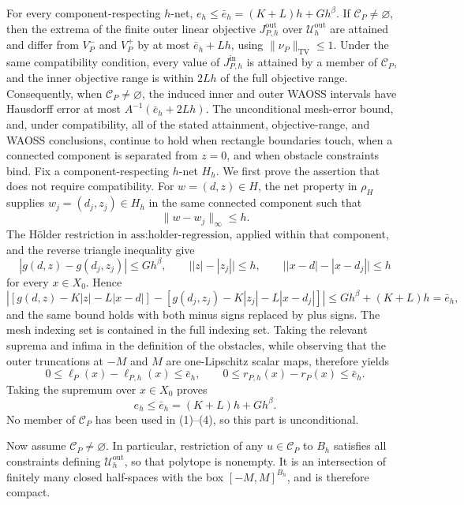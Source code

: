 For every component-respecting \(h\)-net, \(e_h\leq\bar e_h=(K+L)h+Gh^\beta\). If \(\mathcal C_P\neq\varnothing\), then the extrema of the finite outer linear objective \(J_{P,h}^{\mathrm{out}}\) over \(\mathcal U_h^{\mathrm{out}}\) are attained and differ from \(V_P^-\) and \(V_P^+\) by at most \(\bar e_h+Lh\), using \(\|\nu_P\|_{\mathrm{TV}}\leq1\). Under the same compatibility condition, every value of \(J_{P,h}^{\mathrm{in}}\) is attained by a member of \(\mathcal C_P\), and the inner objective range is within \(2Lh\) of the full objective range. Consequently, when \(\mathcal C_P\neq\varnothing\), the induced inner and outer WAOSS intervals have Hausdorff error at most \(A^{-1}(\bar e_h+2Lh)\). The unconditional mesh-error bound, and, under compatibility, all of the stated attainment, objective-range, and WAOSS conclusions, continue to hold when rectangle boundaries touch, when a connected component is separated from \(z=0\), and when obstacle constraints bind.
Fix a component-respecting \(h\)-net \(H_h\). We first prove the assertion that does not require compatibility. For \(w=(d,z)\in H\), the net property in \(\rho_H\) supplies \(w_j=(d_j,z_j)\in H_h\) in the same connected component such that
\[
 \|w-w_j\|_\infty\leq h.
\]
The H\"older restriction in \(\text{ass:holder-regression}\), applied within that component, and the reverse triangle inequality give
\[
 |g(d,z)-g(d_j,z_j)|\leq Gh^\beta,
 \qquad \bigl||z|-|z_j|\bigr|\leq h,
 \qquad \bigl||x-d|-|x-d_j|\bigr|\leq h                         \tag{1}
\]
for every \(x\in X_0\). Hence
\[
 \left|[g(d,z)-K|z|-L|x-d|]-[g(d_j,z_j)-K|z_j|-L|x-d_j|]\right|
 \leq Gh^\beta+(K+L)h=\bar e_h,                                  \tag{2}
\]
and the same bound holds with both minus signs replaced by plus signs. The mesh indexing set is contained in the full indexing set. Taking the relevant suprema and infima in the definition of the obstacles, while observing that the outer truncations at \(-M\) and \(M\) are one-Lipschitz scalar maps, therefore yields
\[
 0\leq \ell_P(x)-\ell_{P,h}(x)\leq\bar e_h,
 \qquad
 0\leq r_{P,h}(x)-r_P(x)\leq\bar e_h.                            \tag{3}
\]
Taking the supremum over \(x\in X_0\) proves
\[
 e_h\leq\bar e_h=(K+L)h+Gh^\beta.                                \tag{4}
\]
No member of \(\mathcal C_P\) has been used in (1)--(4), so this part is unconditional.

Now assume \(\mathcal C_P\neq\varnothing\). In particular, restriction of any \(u\in\mathcal C_P\) to \(B_h\) satisfies all constraints defining \(\mathcal U_h^{\mathrm{out}}\), so that polytope is nonempty. It is an intersection of finitely many closed half-spaces with the box \([-M,M]^{B_h}\), and is therefore compact.


